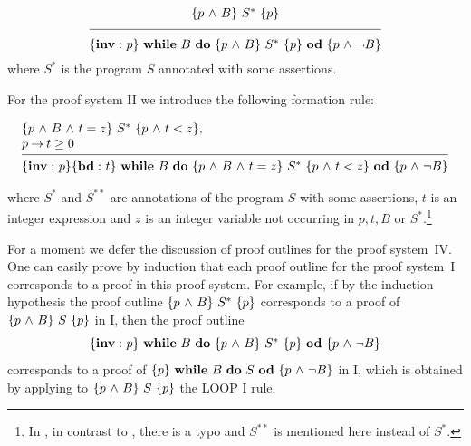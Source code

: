 \documentclass[runningheads]{llncs}       %
\begin{document}
\[
\frac{\raisebox{2mm}{$ \HT{p \A B}{S^*}{p}$}}
            {\raisebox{-2mm}{$\HT{{\bf inv:}\ p}
                 {\WDD{B}{\HT{p \A B}{S^*}{p}}}
                 {p \A \neg B}$}}
\]
where $S^*$ is the program $S$ annotated with some assertions.
\III

For the proof system II we introduce the following formation rule:
\III

\NI
\[
\begin{array}{l}
\HT{p \A B \A t=z}{S^{*}}{p \A t<z},                    \\
p \ra t \geq 0                                          \\
[-\medskipamount]
\hrulefill                                              \\
\C{{\bf inv:}\ p}
\HT{{\bf bd:}\ t}
   {\WDD{B}{\HT{p \A B \A t = z}{S^*}{p \A t<z}}}
   {p \A \neg B}
\end{array}
\]

\NI
where $S^*$ and $S^{**}$ are annotations of
the program $S$ with some assertions, 
$t$ is an integer expression and $z$ is an integer variable
not occurring in $p,t,B$ or $S^{*}$.\footnote{In \cite{ABO09}, in contrast to \cite{ABO90},
there is a typo and $S^{**}$ is mentioned here instead of $S^{*}$.}
\III




For a moment we defer the discussion of proof outlines for the proof
system~IV.  One can easily prove by induction that each proof outline
for the proof system~I corresponds to a proof in this proof
system. For example, if by the induction hypothesis the proof outline
$\mbox{$\{{p \mbox{$\ \wedge\ $} B}\}\ {S^*}\ \{{p}\}$}$ corresponds to a proof of $\mbox{$\{{p \mbox{$\ \wedge\ $} B}\}\ {S}\ \{{p}\}$}$ in
I, then the proof outline
\[
  \HT{{\bf inv:}\ p}{\WDD{B}{\HT{p \A B}{S^*}{p}}}{p \A \neg B}
\]
corresponds to a proof of $\mbox{$\{{p}\}\ {\mbox{$\mbox{{\bf while}\ } {B}\ \mbox{{\bf do}\ } {S}\ \mbox{{\bf od}}$}}\ \{{p \mbox{$\ \wedge\ $} \neg B}\}$}$ in I,
which is obtained by applying to $\mbox{$\{{p \mbox{$\ \wedge\ $} B}\}\ {S}\ \{{p}\}$}$ the LOOP I rule.
\end{document}
